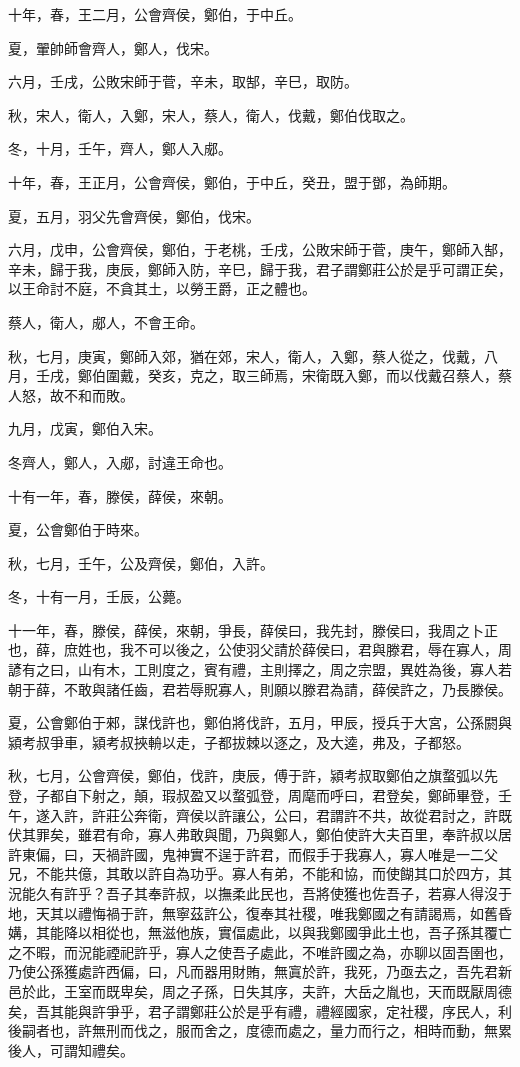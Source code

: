 \begin{pinyinscope}
十年，春，王二月，公會齊侯，鄭伯，于中丘。

夏，翬帥師會齊人，鄭人，伐宋。

六月，壬戌，公敗宋師于菅，辛未，取郜，辛巳，取防。

秋，宋人，衛人，入鄭，宋人，蔡人，衛人，伐戴，鄭伯伐取之。

冬，十月，壬午，齊人，鄭人入郕。

十年，春，王正月，公會齊侯，鄭伯，于中丘，癸丑，盟于鄧，為師期。

夏，五月，羽父先會齊侯，鄭伯，伐宋。

六月，戊申，公會齊侯，鄭伯，于老桃，壬戌，公敗宋師于菅，庚午，鄭師入郜，辛未，歸于我，庚辰，鄭師入防，辛巳，歸于我，君子謂鄭莊公於是乎可謂正矣，以王命討不庭，不貪其土，以勞王爵，正之體也。

蔡人，衛人，郕人，不會王命。

秋，七月，庚寅，鄭師入郊，猶在郊，宋人，衛人，入鄭，蔡人從之，伐戴，八月，壬戌，鄭伯圍戴，癸亥，克之，取三師焉，宋衛既入鄭，而以伐戴召蔡人，蔡人怒，故不和而敗。

九月，戊寅，鄭伯入宋。

冬齊人，鄭人，入郕，討違王命也。

十有一年，春，滕侯，薛侯，來朝。

夏，公會鄭伯于時來。

秋，七月，壬午，公及齊侯，鄭伯，入許。

冬，十有一月，壬辰，公薨。

十一年，春，滕侯，薛侯，來朝，爭長，薛侯曰，我先封，滕侯曰，我周之卜正也，薛，庶姓也，我不可以後之，公使羽父請於薛侯曰，君與滕君，辱在寡人，周諺有之曰，山有木，工則度之，賓有禮，主則擇之，周之宗盟，異姓為後，寡人若朝于薛，不敢與諸任齒，君若辱貺寡人，則願以滕君為請，薛侯許之，乃長滕侯。

夏，公會鄭伯于郲，謀伐許也，鄭伯將伐許，五月，甲辰，授兵于大宮，公孫閼與潁考叔爭車，潁考叔挾輈以走，子都拔棘以逐之，及大逵，弗及，子都怒。

秋，七月，公會齊侯，鄭伯，伐許，庚辰，傅于許，潁考叔取鄭伯之旗蝥弧以先登，子都自下射之，顛，瑕叔盈又以蝥弧登，周麾而呼曰，君登矣，鄭師畢登，壬午，遂入許，許莊公奔衛，齊侯以許讓公，公曰，君謂許不共，故從君討之，許既伏其罪矣，雖君有命，寡人弗敢與聞，乃與鄭人，鄭伯使許大夫百里，奉許叔以居許東偏，曰，天禍許國，鬼神實不逞于許君，而假手于我寡人，寡人唯是一二父兄，不能共億，其敢以許自為功乎。寡人有弟，不能和協，而使餬其口於四方，其況能久有許乎？吾子其奉許叔，以撫柔此民也，吾將使獲也佐吾子，若寡人得沒于地，天其以禮悔禍于許，無寧茲許公，復奉其社稷，唯我鄭國之有請謁焉，如舊昏媾，其能降以相從也，無滋他族，實偪處此，以與我鄭國爭此土也，吾子孫其覆亡之不暇，而況能禋祀許乎，寡人之使吾子處此，不唯許國之為，亦聊以固吾圉也，乃使公孫獲處許西偏，曰，凡而器用財賄，無寘於許，我死，乃亟去之，吾先君新邑於此，王室而既卑矣，周之子孫，日失其序，夫許，大岳之胤也，天而既厭周德矣，吾其能與許爭乎，君子謂鄭莊公於是乎有禮，禮經國家，定社稷，序民人，利後嗣者也，許無刑而伐之，服而舍之，度德而處之，量力而行之，相時而動，無累後人，可謂知禮矣。


\end{pinyinscope}
